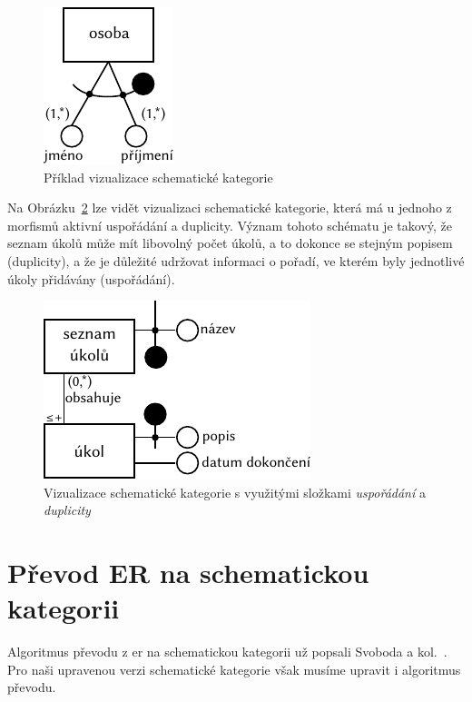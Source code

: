\begin{figure}[!htb]
  \centering
  \includegraphics[width=\maxwidth{\textwidth}]{../img/schemcat-diagrams/schemcat-visualization-example.pdf}
  \caption{Příklad vizualizace schematické kategorie}
  \label{fig:schemcat-visualization-example}
\end{figure}

Na Obrázku~\ref{fig:scv-ord-dup} lze vidět vizualizaci schematické kategorie, která má u jednoho z morfismů aktivní uspořádání a duplicity.
Význam tohoto schématu je takový, že seznam úkolů může mít libovolný počet úkolů, a to dokonce se stejným popisem (duplicity), a že je důležité udržovat informaci o pořadí, ve kterém byly jednotlivé úkoly přidávány (uspořádání).

\begin{figure}[!htb]
  \centering
  \includegraphics[width=\maxwidth{\textwidth}]{../img/schemcat-diagrams/scv-ord-dup.pdf}
  \caption{Vizualizace schematické kategorie s využitými složkami \emph{uspořádání} a \emph{duplicity}}
  \label{fig:scv-ord-dup}
\end{figure}

\section{Převod ER na schematickou kategorii}

Algoritmus převodu z \acrshort{er} na schematickou kategorii už popsali Svoboda a kol.~\cite[s.~192-196]{svoboda_categorical_2021}.
Pro naši upravenou verzi schematické kategorie však musíme upravit i algoritmus převodu.

